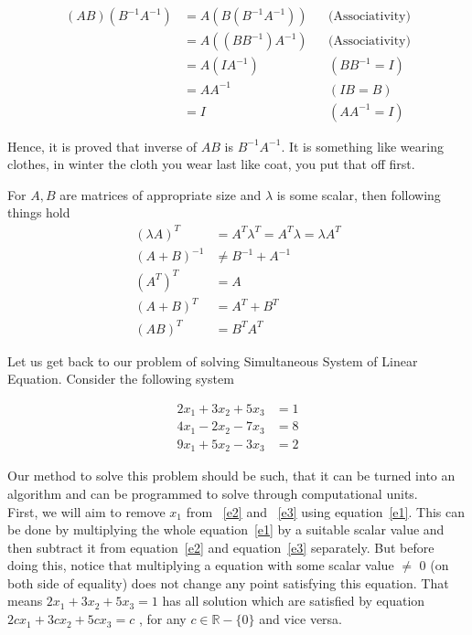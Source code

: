 \documentclass{article}
\begin{document}
\begin{align}
    (AB)(B^{-1}A^{-1}) &= A(B(B^{-1}A^{-1})) && \text{(Associativity)} \nonumber\\
                       &= A((BB^{-1})A^{-1}) && \text{(Associativity)} \nonumber\\
                       &= A(IA^{-1}) && (BB^{-1} = I) \nonumber\\
                       &= AA^{-1} && ( IB = B)\nonumber\\
                       &= I && (AA^{-1} = I)\nonumber
\end{align}

Hence, it is proved that inverse of \(AB\) is \(B^{-1}A^{-1}\). It is something like wearing clothes, in winter the cloth you wear last like coat, you put that off first.

For \(A, B\) are matrices of appropriate size and \(\lambda\) is some scalar, then following things hold 
\begin{align}
 (\lambda A) ^T &= A^T\lambda ^T = A^T\lambda = \lambda A ^ T\nonumber\\
    (A + B)^{-1} &\neq B^{-1} + A^{-1}\nonumber\\
    (A^T)^T &= A\nonumber\\
    (A + B)^T &= A^T + B^T\nonumber\\
    (AB)^T &= B^TA^T\nonumber
\end{align}

Let us get back to our problem of solving Simultaneous System of Linear Equation. Consider the following system

\begin{align}
    2x_1 + 3x_2 + 5x_3 &= 1 \label{e1}\\
    4x_1 - 2x_2 - 7x_3 &= 8 \label{e2}\\
    9x_1 + 5x_2 - 3x_3 &= 2 \label{e3}
\end{align}

Our method to solve this problem should be such, that it can be turned into an algorithm and can be programmed to solve through computational units.\\

First, we will aim to remove \(x_1\) from ~\ref{e2} and ~\ref{e3} using equation~\ref{e1}. This can be done by multiplying the whole equation~\ref{e1} by a suitable scalar value and then subtract it from equation~\ref{e2} and equation~\ref{e3} separately. But before doing this, notice that multiplying a equation with some scalar value $\neq$ 0 (on both side of equality) does not change any point satisfying this equation. That means \( 2x_1 + 3x_2 + 5x_3 = 1 \) has all solution which are satisfied by equation \(2cx_1 + 3cx_2 + 5cx_3 = c\) , for any \(c \in \mathbb{R} - \{0\} \) and vice versa.\\
\end{document}
